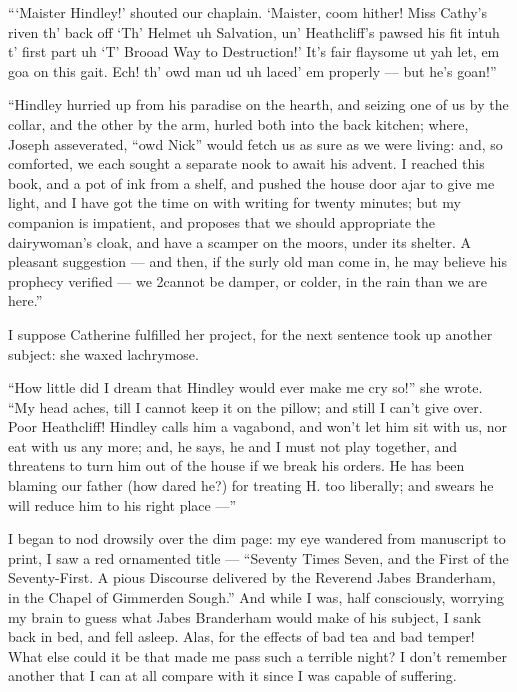 \par “‘Maister Hindley!’ shouted our chaplain. ‘Maister, coom hither! Miss Cathy's riven th' back off ‘Th’ Helmet uh Salvation, un' Heathcliff's pawsed his fit intuh t' first part uh ‘T' Brooad Way to Destruction!’ It's fair flaysome ut yah let, em goa on this gait. Ech! th' owd man ud uh laced' em properly — but he's goan!”
\par “Hindley hurried up from his paradise on the hearth, and seizing one of us by the collar, and the other by the arm, hurled both into the back kitchen; where, Joseph asseverated, “owd Nick” would fetch us as sure as we were living: and, so comforted, we each sought a separate nook to await his advent. I reached this book, and a pot of ink from a shelf, and pushed the house door ajar to give me light, and I have got the time on with writing for twenty minutes; but my companion is impatient, and proposes that we should appropriate the dairywoman's cloak, and have a scamper on the moors, under its shelter. A pleasant suggestion — and then, if the surly old man come in, he may believe his prophecy verified — we 2cannot be damper, or colder, in the rain than we are here.”
\\
\par I suppose Catherine fulfilled her project, for the next sentence took up another subject: she waxed lachrymose.
\par “How little did I dream that Hindley would ever make me cry so!” she wrote. “My head aches, till I cannot keep it on the pillow; and still I can't give over. Poor Heathcliff! Hindley calls him a vagabond, and won't let him sit with us, nor eat with us any more; and, he says, he and I must not play together, and threatens to turn him out of the house if we break his orders. He has been blaming our father (how dared he?) for treating H. too liberally; and swears he will reduce him to his right place —”
\\ 
\par I began to nod drowsily over the dim page: my eye wandered from manuscript to print, I saw a red ornamented title — “Seventy Times Seven, and the First of the Seventy-First. A pious Discourse delivered by the Reverend Jabes Branderham, in the Chapel of Gimmerden Sough.” And while I was, half consciously, worrying my brain to guess what Jabes Branderham would make of his subject, I sank back in bed, and fell asleep. Alas, for the effects of bad tea and bad temper! What else could it be that made me pass such a terrible night? I don't remember another that I can at all compare with it since I was capable of suffering.
